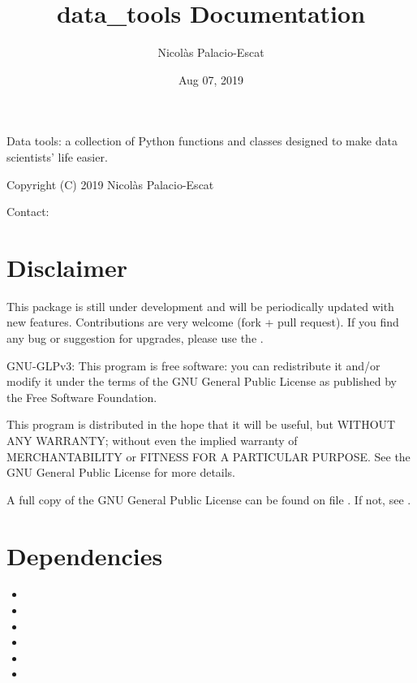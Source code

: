 \documentclass[letterpaper,10pt,english]{sphinxmanual}
\title{data\_tools Documentation}
\date{Aug 07, 2019}
\author{Nicolàs Palacio-Escat}
\begin{document}
\pagestyle{empty}
\sphinxmaketitle
\pagestyle{plain}
\sphinxtableofcontents
\pagestyle{normal}
\label{\detokenize{index::doc}}


Data tools: a collection of Python functions and classes designed to
make data scientists’ life easier.

Copyright (C) 2019 Nicolàs Palacio-Escat

Contact: 


\chapter{Disclaimer}
\label{\detokenize{index:disclaimer}}
This package is still under development and will be periodically updated
with new features. Contributions are very welcome (fork + pull request).
If you find any bug or suggestion for upgrades, please use the
.

GNU-GLPv3:
This program is free software: you can redistribute it and/or modify it
under the terms of the GNU General Public License as published by the
Free Software Foundation.

This program is distributed in the hope that it will be useful, but
WITHOUT ANY WARRANTY; without even the implied warranty of
MERCHANTABILITY or FITNESS FOR A PARTICULAR PURPOSE. See the GNU General
Public License for more details.

A full copy of the GNU General Public License can be found on file
.
If not, see .


\chapter{Dependencies}
\label{\detokenize{index:dependencies}}\begin{itemize}
\item {} 

\item {} 

\item {} 

\item {} 

\item {} 

\item {} 

\end{itemize}
\end{document}
